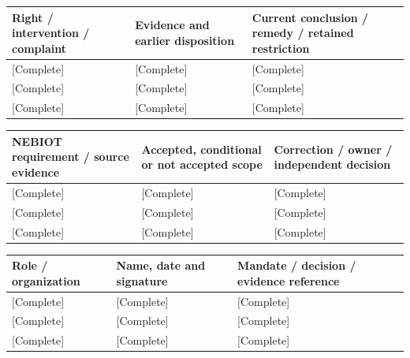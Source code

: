 {\sffamily\fontsize{8.3}{10.3}\selectfont\begin{longtable}{@{}P{54.83mm} P{54.83mm} P{54.83mm}@{}}
\toprule
\textbf{Right / intervention / complaint} & \textbf{Evidence and earlier disposition} & \textbf{Current conclusion / remedy / retained restriction}\\\midrule\endhead
\rule{0pt}{8mm}[Complete] & [Complete] & [Complete]\\\hline
\rule{0pt}{8mm}[Complete] & [Complete] & [Complete]\\\hline
\rule{0pt}{8mm}[Complete] & [Complete] & [Complete]\\\hline
\end{longtable}}
{\sffamily\fontsize{8.3}{10.3}\selectfont\begin{longtable}{@{}P{54.83mm} P{54.83mm} P{54.83mm}@{}}
\toprule
\textbf{NEBIOT requirement / source evidence} & \textbf{Accepted, conditional or not accepted scope} & \textbf{Correction / owner / independent decision}\\\midrule\endhead
\rule{0pt}{8mm}[Complete] & [Complete] & [Complete]\\\hline
\rule{0pt}{8mm}[Complete] & [Complete] & [Complete]\\\hline
\rule{0pt}{8mm}[Complete] & [Complete] & [Complete]\\\hline
\end{longtable}}
{\sffamily\fontsize{8.3}{10.3}\selectfont\begin{longtable}{@{}P{54.83mm} P{54.83mm} P{54.83mm}@{}}
\toprule
\textbf{Role / organization} & \textbf{Name, date and signature} & \textbf{Mandate / decision / evidence reference}\\\midrule\endhead
\rule{0pt}{8mm}[Complete] & [Complete] & [Complete]\\\hline
\rule{0pt}{8mm}[Complete] & [Complete] & [Complete]\\\hline
\rule{0pt}{8mm}[Complete] & [Complete] & [Complete]\\\hline
\end{longtable}}

